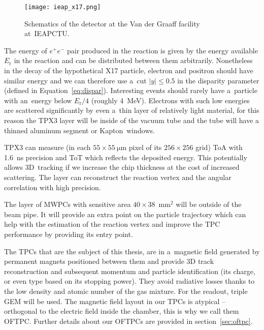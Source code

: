 			\begin{figure}
				\centering
				\texttt{[image: ieap\_x17.png]}
				\caption{Schematics of the detector at the Van der Graaff facility at~\ac{IEAPCTU}.}
				\label{fig:ieap}
			\end{figure}
		
		The energy of $e^+e^-$ pair produced in the reaction is given by the energy available $E_\text{r}$ in the reaction and can be distributed between them arbitrarily. Nonetheless in the decay of the hypothetical X17 particle, electron and positron should have similar energy and we can therefore use a~cut $|y| \leq 0.5$ in the disparity parameter (defined in Equation~\ref{eq:dispar}). Interesting events should rarely have a~particle with an~energy below $E_\text{r}/4$ (roughly 4~MeV). Electrons with such low energies are scattered significantly by even a~thin layer of relatively light material, for this reason the \ac{TPX3} layer will be inside of the vacuum tube and the tube will have a thinned aluminum segment or Kapton\texttrademark\ windows.
		
		\ac{TPX3} can measure (in each $55\times55~\mathrm{\mu m}$ pixel of its $256\times256$ grid) \ac{ToA} with 1.6~ns precision and \ac{ToT} which reflects the deposited energy. This potentially allows 3D~tracking if we increase the chip thickness at the cost of increased scattering. The layer can reconstruct the reaction vertex and the angular correlation with high precision.
		
		The layer of \acp{MWPC} with sensitive area $40\times38$~mm$^2$ will be outside of the beam pipe. It will provide an extra point on the particle trajectory which can help with the estimation of the reaction vertex and improve the \ac{TPC} performance by providing its entry point.
		
		The \acp{TPC} that are the subject of this thesis, are in a~magnetic field generated by permanent magnets positioned between them and provide 3D track reconstruction and subsequent momentum and particle identification (its charge, or even type based on its stopping power). They avoid radiative losses thanks to the low density and atomic number of the gas mixture. For the readout, triple \ac{GEM} will be used. The magnetic field layout in our \acp{TPC} is atypical -- orthogonal to the electric field inside the chamber, this is why we call them \acf{OFTPC}. Further details about our \acp{OFTPC} are provided in section~\ref{sec:oftpc}.
